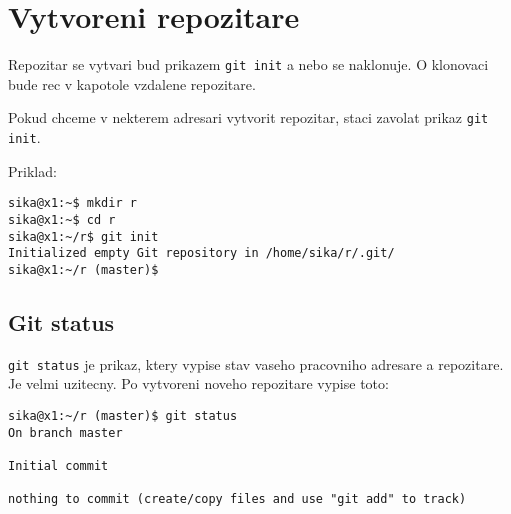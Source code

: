 \section{Vytvoreni repozitare}

Repozitar se vytvari bud prikazem \lstinline|git init| a nebo se naklonuje. O klonovaci bude rec v kapotole vzdalene repozitare.

Pokud chceme v nekterem adresari vytvorit repozitar, staci zavolat prikaz \lstinline|git init|.

Priklad:

\begin{lstlisting}
sika@x1:~$ mkdir r
sika@x1:~$ cd r
sika@x1:~/r$ git init
Initialized empty Git repository in /home/sika/r/.git/
sika@x1:~/r (master)$
\end{lstlisting}

\subsection{Git status}

\lstinline|git status| je prikaz, ktery vypise stav vaseho pracovniho adresare a repozitare. Je velmi uzitecny. Po vytvoreni noveho repozitare vypise toto:

\begin{lstlisting}
sika@x1:~/r (master)$ git status
On branch master

Initial commit

nothing to commit (create/copy files and use "git add" to track)
\end{lstlisting}

